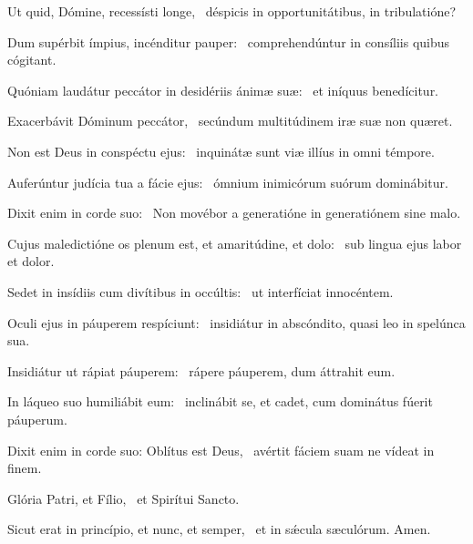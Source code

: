 \item Ut quid, Dómine, recessísti longe,~\psstar{}  déspicis in opportunitátibus, in tribulatióne?
\item Dum supérbit ímpius, incénditur pauper:~\psstar{} comprehendúntur in consíliis quibus cógitant.
\item Quóniam laudátur peccátor in desidériis ánimæ suæ:~\psstar{} et iníquus benedícitur.
\item Exacerbávit Dóminum peccátor,~\psstar{} secúndum multitúdinem iræ suæ non quæret.
\item Non est Deus in conspéctu ejus:~\psstar{} inquinátæ sunt viæ illíus in omni témpore.
\item Auferúntur judícia tua a fácie ejus:~\psstar{} ómnium inimicórum suórum dominábitur.
\item Dixit enim in corde suo:~\psstar{} Non movébor a generatióne in generatiónem sine malo.
\item Cujus maledictióne os plenum est, et amaritúdine, et dolo:~\psstar{} sub lingua ejus labor et dolor.
\item Sedet in insídiis cum divítibus in occúltis:~\psstar{} ut interfíciat innocéntem.
\item Oculi ejus in páuperem respíciunt:~\psstar{} insidiátur in abscóndito, quasi leo in spelúnca sua.
\item Insidiátur ut rápiat páupe\-rem:~\psstar{} rápere páuperem, dum áttrahit eum.
\item In láqueo suo humiliábit eum:~\psstar{} inclinábit se, et cadet, cum dominátus fúerit páuperum.
\item Dixit enim in corde suo: Oblítus est Deus,~\psstar{} avértit fáciem suam ne vídeat in finem.
\item Glória Patri, et Fílio,~\psstar{} et Spirítui Sancto.
\item Sicut erat in princípio, et nunc, et semper,~\psstar{} et in sǽcula sæculórum. Amen.
